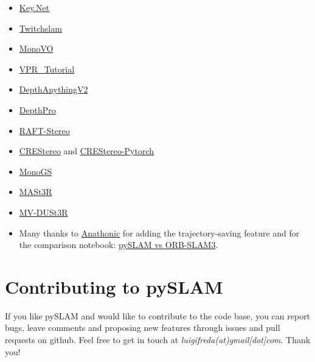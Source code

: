 \documentclass{article}
\begin{document}
\begin{itemize}
\item
  \href{https://github.com/axelBarroso/Key.Net}{Key.Net} \cite{barroso2020key}
\item
  \href{https://github.com/geohot/twitchslam}{Twitchslam} 
\item
  \href{https://github.com/uoip/monoVO-python}{MonoVO} 
\item
  \href{https://github.com/stschubert/VPR_Tutorial.git}{VPR\_Tutorial} \cite{VPR_Tutorial}
\item
  \href{https://github.com/DepthAnything/Depth-Anything-V2}{DepthAnythingV2} \cite{DepthAnythingV2}
\item
  \href{https://github.com/apple/ml-depth-pro}{DepthPro} \cite{depthpro2023}
\item
  \href{https://github.com/princeton-vl/RAFT-Stereo}{RAFT-Stereo} \cite{RAFTStereo}
\item
  \href{https://github.com/megvii-research/CREStereo}{CREStereo} and
  \href{https://github.com/ibaiGorordo/CREStereo-Pytorch}{CREStereo-Pytorch} \cite{CREStereo}
\item
  \href{https://github.com/muskie82/MonoGS}{MonoGS} \cite{MonoGS}
\item
  \href{https://github.com/naver/mast3r}{MASt3R} \cite{master}
\item
  \href{https://github.com/facebookresearch/mvdust3r}{MV-DUSt3R} \cite{mvduster}
\item
  Many thanks to \href{https://github.com/anathonic}{Anathonic} for
  adding the trajectory-saving feature and for the comparison notebook:
  \href{https://github.com/anathonic/Trajectory-Comparison-ORB-SLAM3-pySLAM/blob/main/trajectories_comparison.ipynb}{pySLAM vs ORB-SLAM3}.
\end{itemize}


\hypertarget{contributing-to-pyslam}{%
\section{Contributing to pySLAM}\label{contributing-to-pyslam}}

If you like pySLAM and would like to contribute to the code base, you
can report bugs, leave comments and proposing new features through
issues and pull requests on github. Feel free to get in touch at
\emph{luigifreda(at)gmail{[}dot{]}com}. Thank you!





\end{document}
